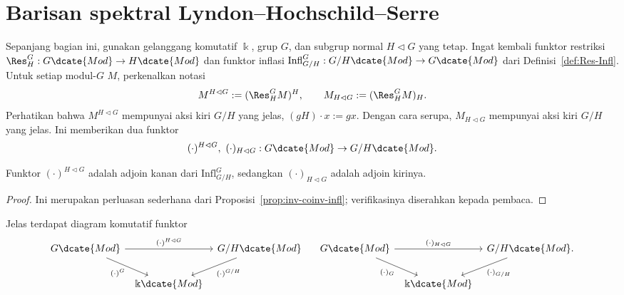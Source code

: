 
\section{Barisan spektral Lyndon--Hochschild--Serre}\label{sec:LHS-SS}
\hypertarget{o014.aljabr2.chapter6.lhs-spectral-sequence-a}{ }

Sepanjang bagian ini, gunakan gelanggang komutatif $\Bbbk$, grup $G$, dan
subgrup normal $H\lhd G$ yang tetap. Ingat kembali funktor restriksi
$\Res^G_H:G\dcate{Mod}\to H\dcate{Mod}$ dan funktor inflasi
$\mathrm{Infl}^G_{G/H}:G/H\dcate{Mod}\to G\dcate{Mod}$ dari
Definisi~\ref{def:Res-Infl}. Untuk setiap modul-$G$ $M$, perkenalkan notasi
\[ M^{H\lhd G}:=(\Res^G_HM)^H,\qquad
	M_{H\lhd G}:=(\Res^G_HM)_H. \]
Perhatikan bahwa $M^{H\lhd G}$ mempunyai aksi kiri $G/H$ yang jelas,
$(gH)\cdot x:=gx$. Dengan cara serupa, $M_{H\lhd G}$ mempunyai aksi kiri
$G/H$ yang jelas. Ini memberikan dua funktor
\[ (\cdot)^{H\lhd G},\ (\cdot)_{H\lhd G}:
	G\dcate{Mod}\to G/H\dcate{Mod}. \]

\begin{lemma}
	Funktor $(\cdot)^{H\lhd G}$ adalah adjoin kanan dari
	$\mathrm{Infl}^G_{G/H}$, sedangkan $(\cdot)_{H\lhd G}$ adalah adjoin
	kirinya.
\end{lemma}
\begin{proof}
	Ini merupakan perluasan sederhana dari
	Proposisi~\ref{prop:inv-coinv-infl}; verifikasinya diserahkan kepada
	pembaca.
\end{proof}

Jelas terdapat diagram komutatif funktor
\[\begin{tikzcd}[column sep=tiny]
	G\dcate{Mod} \arrow[rr,"{(\cdot)^{H\lhd G}}"]
	\arrow[rd,"{(\cdot)^G}"'] & &
	G/H\dcate{Mod} \arrow[ld,"{(\cdot)^{G/H}}"]\\
	& \Bbbk\dcate{Mod} &
\end{tikzcd}\quad\begin{tikzcd}[column sep=tiny]
	G\dcate{Mod} \arrow[rr,"{(\cdot)_{H\lhd G}}"]
	\arrow[rd,"{(\cdot)_G}"'] & &
	G/H\dcate{Mod}. \arrow[ld,"{(\cdot)_{G/H}}"]\\
	& \Bbbk\dcate{Mod} &
\end{tikzcd}\]

